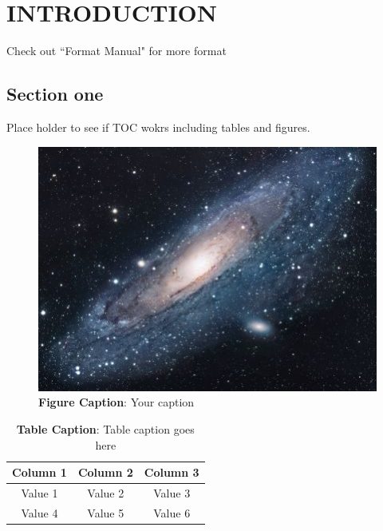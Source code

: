 \chapter{INTRODUCTION}

\fancyhf{}
\fancyfoot[C]{ \thepage}



\label{Introduction}
Check out ``Format Manual" for more format\cite{asu2023}
\section{Section one}
Place holder to see if TOC wokrs including tables and figures.

\begin{figure}[htbp]
\centering
\includegraphics[width =0.65\columnwidth]{figure/universe.jpg}
\caption[Figure Caption]{ \centering \textbf{Figure Caption}: Your caption}
\label{fig:universe}
\end{figure}


\begin{table}[h!]
    \centering
    \begin{adjustbox}{width=0.5\textwidth}
        \begin{tabular}{|c|c|c|}\hline
            \multicolumn{1}{|c|}{\textbf{Column 1}} & \multicolumn{1}{c|}{\textbf{Column 2}} & \multicolumn{1}{c|}{\textbf{Column 3}} \\ \hline
            Value 1 & Value 2 & Value 3 \\ \hline
            Value 4 & Value 5 & Value 6 \\ \hline
        \end{tabular}
    \end{adjustbox}
    \caption[Table Caption]{\centering \textbf{Table Caption}: Table caption goes here}
    \label{table:test}
\end{table}


